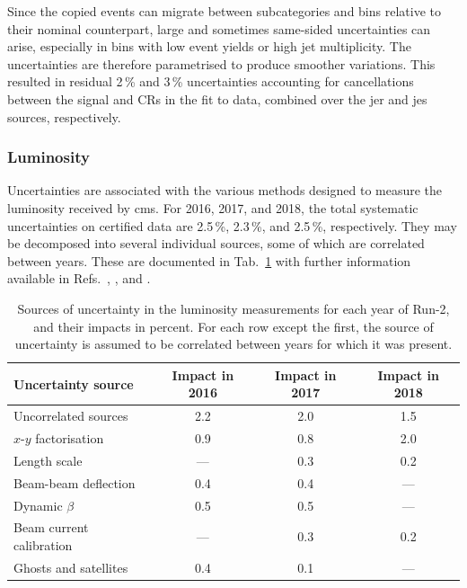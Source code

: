 Since the copied events can migrate between subcategories and \ptmiss bins relative to their nominal counterpart, large and sometimes same-sided uncertainties can arise, especially in bins with low event yields or high \gls{jet} multiplicity. The uncertainties are therefore parametrised to produce smoother variations. This resulted in residual 2\,\% and 3\,\% uncertainties accounting for cancellations between the signal and \glspl{CR} in the fit to data, combined over the \acrshort{jer} and \acrshort{jes} sources, respectively.




\subsubsection{Luminosity}
\label{subsubsec:htoinv_lumi_syst}

Uncertainties are associated with the various methods designed to measure the luminosity received by \acrshort{cms}. For 2016, 2017, and 2018, the total systematic uncertainties on certified data are 2.5\,\%, 2.3\,\%, and 2.5\,\%, respectively. They may be decomposed into several individual sources, some of which are correlated between years. These are documented in Tab.~\ref{tab:lumi_systs} with further information available in Refs.~, , and .

\begin{table}[htbp]
    \centering
    \begin{tabular}{lccc}
        \toprule
        Uncertainty source & Impact in 2016 & Impact in 2017 & Impact in 2018 \\\midrule
        Uncorrelated sources & 2.2 & 2.0 & 1.5 \\
        $x$-$y$ factorisation & 0.9 & 0.8 & 2.0 \\
        Length scale & --- & 0.3 & 0.2 \\
        Beam-beam deflection & 0.4 & 0.4 & --- \\
        Dynamic $\beta$ & 0.5 & 0.5 & --- \\
        Beam current calibration & --- & 0.3 & 0.2 \\
        Ghosts and satellites & 0.4 & 0.1 & ---  \\
        \bottomrule
    \end{tabular}
    \caption[Sources of uncertainty in the luminosity measurements for each year of Run-2]{Sources of uncertainty in the luminosity measurements for each year of Run-2, and their impacts in percent. For each row except the first, the source of uncertainty is assumed to be correlated between years for which it was present.}
    \label{tab:lumi_systs}
\end{table}

